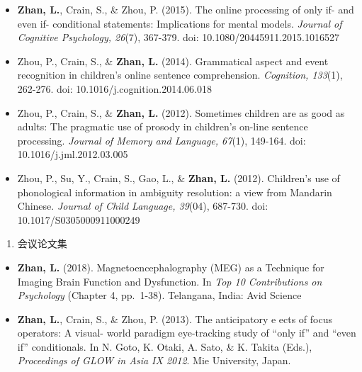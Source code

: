 \documentclass[12pt,]{article}
\providecommand{\tightlist}{%
  \setlength{\itemsep}{0pt}\setlength{\parskip}{0pt}}
\begin{document}
\begin{itemize}
{  44}(5), 1025-1040. doi: 10.1017/S0305000916000313
  \href{https://publications.likan.info/Periodicals/JChildLang2016.pdf}{
  \faFilePdf[regular] }
\item
  \textbf{Zhan, L.}, Crain, S., \& Zhou, P. (2015). The online
  processing of only if- and even if- conditional statements:
  Implications for mental models. \emph{Journal of Cognitive Psychology,
  26}(7), 367-379. doi: 10.1080/20445911.2015.1016527
  \href{https://publications.likan.info/Periodicals/JCognPsychol2015.pdf}{
  \faFilePdf[regular] }
\item
  Zhou, P., Crain, S., \& \textbf{Zhan, L.} (2014). Grammatical aspect
  and event recognition in children's online sentence comprehension.
  \emph{Cognition, 133}(1), 262-276. doi:
  10.1016/j.cognition.2014.06.018
  \href{http://publications.likan.info/Periodicals/Cognition2014.pdf}{
  \faFilePdf[regular] }
\item
  Zhou, P., Crain, S., \& \textbf{Zhan, L.} (2012). Sometimes children
  are as good as adults: The pragmatic use of prosody in children's
  on-line sentence processing. \emph{Journal of Memory and Language,
  67}(1), 149-164. doi: 10.1016/j.jml.2012.03.005
  \href{https://publications.likan.info/Periodicals/JMemLang2012.pdf}{
  \faFilePdf[regular] }
\item
  Zhou, P., Su, Y., Crain, S., Gao, L., \& \textbf{Zhan, L.} (2012).
  Children's use of phonological information in ambiguity resolution: a
  view from Mandarin Chinese. \emph{Journal of Child Language, 39}(04),
  687-730. doi: 10.1017/S0305000911000249
  \href{https://publications.likan.info/Periodicals/JChildLang2012.pdf}{
  \faFilePdf[regular] }
\end{itemize}

\begin{enumerate}
\def\labelenumi{\arabic{enumi}.}
\setcounter{enumi}{2}
\tightlist
\item
  会议论文集
\end{enumerate}

\begin{itemize}
\item
  \textbf{Zhan, L.} (2018). Magnetoencephalography (MEG) as a Technique
  for Imaging Brain Function and Dysfunction. In \emph{Top 10
  Contributions on Psychology} (Chapter 4, pp.~1-38). Telangana, India:
  Avid Science
\item
  \textbf{Zhan, L.}, Crain, S., \& Zhou, P. (2013). The anticipatory e
  ects of focus operators: A visual- world paradigm eye-tracking study
  of ``only if'' and ``even if'' conditionals. In N. Goto, K. Otaki, A.
  Sato, \& K. Takita (Eds.), \emph{Proceedings of GLOW in Asia IX 2012}.
  Mie University, Japan.
\end{itemize}
\end{document}
